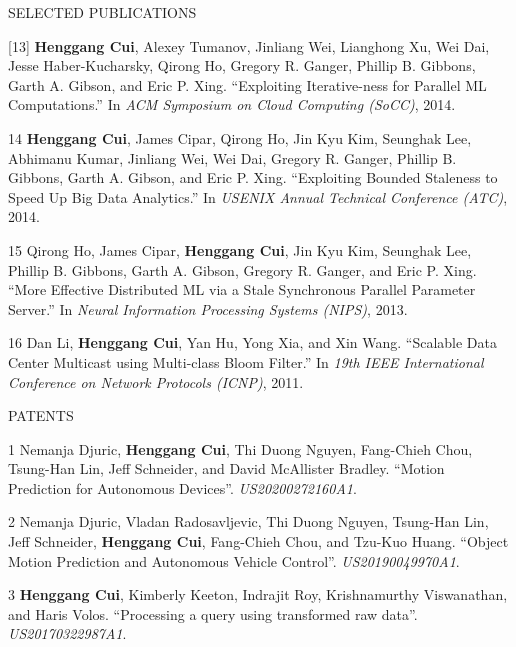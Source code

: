 \documentclass{resume} %
\begin{document}
\begin{rSection}{SELECTED PUBLICATIONS}
{    [13]
        {\bf Henggang Cui}, Alexey Tumanov, Jinliang Wei, Lianghong Xu, Wei Dai, Jesse Haber-Kucharsky, Qirong Ho, Gregory R. Ganger, Phillip B. Gibbons, Garth A. Gibson, and Eric P. Xing.
        ``Exploiting Iterative-ness for Parallel ML Computations.''
        In \emph{ACM Symposium on Cloud Computing (SoCC)}, 2014.
    \item
    [14]
        {\bf Henggang Cui}, James Cipar, Qirong Ho, Jin Kyu Kim, Seunghak Lee, Abhimanu Kumar, Jinliang Wei, Wei Dai, Gregory R. Ganger, Phillip B. Gibbons, Garth A. Gibson, and Eric P. Xing.
        ``Exploiting Bounded Staleness to Speed Up Big Data Analytics.''
        In \emph{USENIX Annual Technical Conference (ATC)}, 2014.
    \item
    [15]
        Qirong Ho, James Cipar, {\bf Henggang Cui}, Jin Kyu Kim, Seunghak Lee, Phillip B. Gibbons, Garth A. Gibson, Gregory R. Ganger, and Eric P. Xing.
        ``More Effective Distributed ML via a Stale Synchronous Parallel Parameter Server.''
        In \emph{Neural Information Processing Systems (NIPS)}, 2013.
    \item
    [16]
        Dan Li, {\bf Henggang Cui}, Yan Hu, Yong Xia, and Xin Wang.
        ``Scalable Data Center Multicast using Multi-class Bloom Filter.''
        In \emph{19th IEEE International Conference on Network Protocols (ICNP)}, 2011.
}
\end{rSection}
\vspace{-.05in}



\begin{rSection}{PATENTS}
\vspace{-.1in}
\footnotesize{
    \item
    [1]
        Nemanja Djuric, {\bf Henggang Cui}, Thi Duong Nguyen, Fang-Chieh Chou, Tsung-Han Lin, Jeff Schneider, and David McAllister Bradley.
        ``Motion Prediction for Autonomous Devices''.
        \emph{US20200272160A1}.
    \item
    [2]
        Nemanja Djuric, Vladan Radosavljevic, Thi Duong Nguyen, Tsung-Han Lin, Jeff Schneider, {\bf Henggang Cui}, Fang-Chieh Chou, and Tzu-Kuo Huang.
        ``Object Motion Prediction and Autonomous Vehicle Control''.
        \emph{US20190049970A1}.
    \item
    [3]
        {\bf Henggang Cui}, Kimberly Keeton, Indrajit Roy, Krishnamurthy Viswanathan, and Haris Volos.
        ``Processing a query using transformed raw data''.
        \emph{US20170322987A1}.
}
\end{rSection}
\vspace{-.05in}
\end{document}
